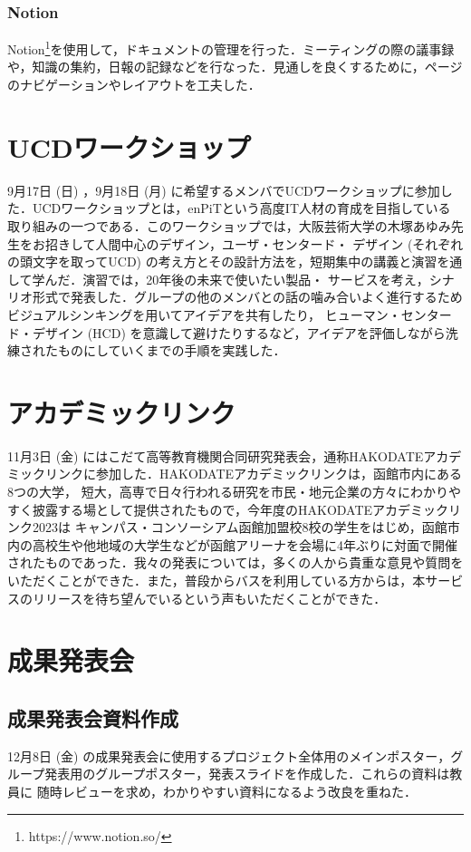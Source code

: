 \subsubsection{Notion}
Notion\footnote{https://www.notion.so/}を使用して，ドキュメントの管理を行った．ミーティングの際の議事録や，知識の集約，日報の記録などを行なった．見通しを良くするために，ページのナビゲーションやレイアウトを工夫した．

\section{UCDワークショップ}
9月17日 (日) ，9月18日 (月) に希望するメンバでUCDワークショップに参加した．UCDワークショップとは，enPiTという高度IT人材の育成を目指している
取り組みの一つである．このワークショップでは，大阪芸術大学の木塚あゆみ先生をお招きして人間中心のデザイン，ユーザ・センタード・
デザイン (それぞれの頭文字を取ってUCD) の考え方とその設計方法を，短期集中の講義と演習を通して学んだ．演習では，20年後の未来で使いたい製品・
サービスを考え，シナリオ形式で発表した．グループの他のメンバとの話の噛み合いよく進行するためビジュアルシンキングを用いてアイデアを共有したり，
ヒューマン・センタード・デザイン (HCD) を意識して避けたりするなど，アイデアを評価しながら洗練されたものにしていくまでの手順を実践した．

\section{アカデミックリンク}
11月3日 (金) にはこだて高等教育機関合同研究発表会，通称HAKODATEアカデミックリンクに参加した．HAKODATEアカデミックリンクは，函館市内にある8つの大学，
短大，高専で日々行われる研究を市民・地元企業の方々にわかりやすく披露する場として提供されたもので，今年度のHAKODATEアカデミックリンク2023は
キャンパス・コンソーシアム函館加盟校8校の学生をはじめ，函館市内の高校生や他地域の大学生などが函館アリーナを会場に4年ぶりに対面で開催されたものであった．我々の発表については，多くの人から貴重な意見や質問をいただくことができた．また，普段からバスを利用している方からは，本サービスのリリースを待ち望んでいるという声もいただくことができた．

\section{成果発表会}
\subsection{成果発表会資料作成}
12月8日 (金) の成果発表会に使用するプロジェクト全体用のメインポスター，グループ発表用のグループポスター，発表スライドを作成した．これらの資料は教員に
随時レビューを求め，わかりやすい資料になるよう改良を重ねた．

